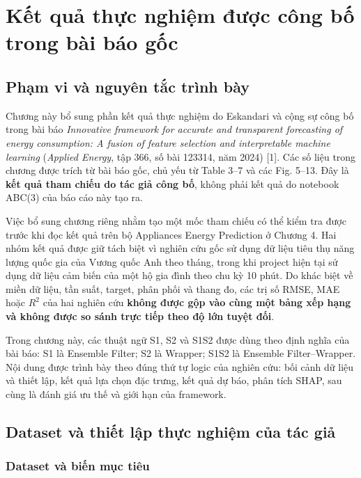 \chapter{Kết quả thực nghiệm được công bố trong bài báo gốc}
\label{chap:original-authors-results}

\section{Phạm vi và nguyên tắc trình bày}

Chương này bổ sung phần kết quả thực nghiệm do Eskandari và cộng sự công bố trong bài báo \emph{Innovative framework for accurate and transparent forecasting of energy consumption: A fusion of feature selection and interpretable machine learning} (\emph{Applied Energy}, tập 366, số bài 123314, năm 2024) [1]. Các số liệu trong chương được trích từ bài báo gốc, chủ yếu từ Table 3--7 và các Fig. 5--13. Đây là \textbf{kết quả tham chiếu do tác giả công bố}, không phải kết quả do notebook ABC(3) của báo cáo này tạo ra.

Việc bổ sung chương riêng nhằm tạo một mốc tham chiếu có thể kiểm tra được trước khi đọc kết quả trên bộ Appliances Energy Prediction ở Chương 4. Hai nhóm kết quả được giữ tách biệt vì nghiên cứu gốc sử dụng dữ liệu tiêu thụ năng lượng quốc gia của Vương quốc Anh theo tháng, trong khi project hiện tại sử dụng dữ liệu cảm biến của một hộ gia đình theo chu kỳ 10 phút. Do khác biệt về miền dữ liệu, tần suất, target, phân phối và thang đo, các trị số RMSE, MAE hoặc $R^2$ của hai nghiên cứu \textbf{không được gộp vào cùng một bảng xếp hạng và không được so sánh trực tiếp theo độ lớn tuyệt đối}.

Trong chương này, các thuật ngữ S1, S2 và S1S2 được dùng theo định nghĩa của bài báo: S1 là Ensemble Filter; S2 là Wrapper; S1S2 là Ensemble Filter--Wrapper. Nội dung được trình bày theo đúng thứ tự logic của nghiên cứu: bối cảnh dữ liệu và thiết lập, kết quả lựa chọn đặc trưng, kết quả dự báo, phân tích SHAP, sau cùng là đánh giá ưu thế và giới hạn của framework.

\section{Dataset và thiết lập thực nghiệm của tác giả}

\subsection{Dataset và biến mục tiêu}

